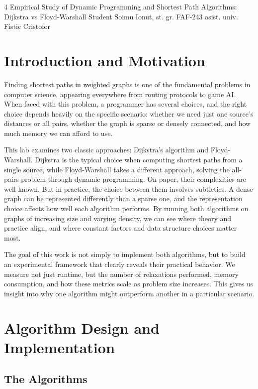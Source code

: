 \documentclass{labreport}
\begin{document}
\labtitle
    {4}
    {Empirical Study of Dynamic Programming and Shortest Path Algorithms: Dijkstra vs Floyd-Warshall}
    {Student}
    {Soimu Ionut, st. gr. FAF-243}
    {asist. univ. Fistic Cristofor}

\tableofcontents
\newpage

\lstset{style=python}

\section{Introduction and Motivation}

Finding shortest paths in weighted graphs is one of the fundamental problems in computer science, appearing everywhere from routing protocols to game AI. When faced with this problem, a programmer has several choices, and the right choice depends heavily on the specific scenario: whether we need just one source's distances or all pairs, whether the graph is sparse or densely connected, and how much memory we can afford to use.

This lab examines two classic approaches: Dijkstra's algorithm and Floyd-Warshall. Dijkstra is the typical choice when computing shortest paths from a single source, while Floyd-Warshall takes a different approach, solving the all-pairs problem through dynamic programming. On paper, their complexities are well-known. But in practice, the choice between them involves subtleties. A dense graph can be represented differently than a sparse one, and the representation choice affects how well each algorithm performs. By running both algorithms on graphs of increasing size and varying density, we can see where theory and practice align, and where constant factors and data structure choices matter most.

The goal of this work is not simply to implement both algorithms, but to build an experimental framework that clearly reveals their practical behavior. We measure not just runtime, but the number of relaxations performed, memory consumption, and how these metrics scale as problem size increases. This gives us insight into why one algorithm might outperform another in a particular scenario.

\section{Algorithm Design and Implementation}

\subsection{The Algorithms}
\end{document}
